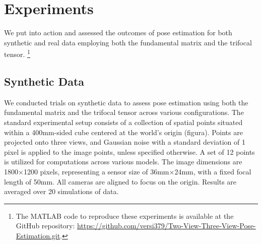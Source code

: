\section{Experiments}\label{sec:experiments}
We put into action and assessed the outcomes of pose estimation for both synthetic and real data employing both the fundamental matrix and the trifocal tensor. \footnote{The MATLAB code to reproduce these experiments is available at the GitHub repository: \href{https://github.com/versi379/Two-View-Three-View-Pose-Estimation.git}{https://github.com/versi379/Two-View-Three-View-Pose-Estimation.git}.}

\subsection{Synthetic Data}
We conducted trials on synthetic data to assess pose estimation using both the fundamental matrix and the trifocal tensor across various configurations. The standard experimental setup consists of a collection of spatial points situated within a 400mm-sided cube centered at the world's origin (figura). Points are projected onto three views, and Gaussian noise with a standard deviation of 1 pixel is applied to the image points, unless specified otherwise. A set of 12 points is utilized for computations across various models. The image dimensions are 1800×1200 pixels, representing a sensor size of 36mm×24mm, with a fixed focal length of 50mm. All cameras are aligned to focus on the origin. Results are averaged over 20 simulations of data.\\



